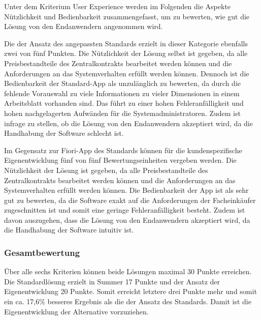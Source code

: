 Unter dem Kriterium User Experience werden im Folgenden die Aspekte Nützlichkeit und Bedienbarkeit zusammengefasst, um zu bewerten, wie gut die Lösung von den Endanwendern angenommen wird. 

Die der Ansatz des angepassten Standards erzielt in dieser Kategorie ebenfalls zwei von fünf Punkten. Die Nützlichkeit der Lösung selbst ist gegeben, da alle Preisbestandteile des Zentralkontrakts bearbeitet werden können und die Anforderungen an das Systemverhalten erfüllt werden können. Dennoch ist die Bedienbarkeit der Standard-App als unzulänglich zu bewerten, da durch die fehlende Vorauswahl zu viele Informationen zu vieler Dimensionen in einem Arbeitsblatt vorhanden sind. Das führt zu einer hohen Fehleranfälligkeit und hohen nachgelagerten Aufwänden für die Systemadministratoren. Zudem ist infrage zu stellen, ob die Lösung von den Endanwendern akzeptiert wird, da die Handhabung der Software schlecht ist.

Im Gegensatz zur Fiori-App des Standards können für die kundenspezifische Eigenentwicklung fünf von fünf Bewertungseinheiten vergeben werden. Die Nützlichkeit der Lösung ist gegeben, da alle Preisbestandteile des Zentralkontrakts bearbeitet werden können und die Anforderungen an das Systemverhalten erfüllt werden können. Die Bedienbarkeit der App ist als sehr gut zu bewerten, da die Software exakt auf die Anforderungen der Facheinkäufer zugeschnitten ist und somit eine geringe Fehleranfälligkeit besteht. Zudem ist davon auszugehen, dass die Lösung von den Endanwendern akzeptiert wird, da die Handhabung der Software intuitiv ist.

\subsubsection{Gesamtbewertung}

Über alle sechs Kriterien können beide Lösungen maximal 30 Punkte erreichen. Die Standardlösung erzielt in Summer 17 Punkte und der Ansatz der Eigenentwicklung 20 Punkte. Somit erreicht letztere drei Punkte mehr und somit ein ca. 17,6\% besseres Ergebnis als die der Ansatz des Standards. Damit ist die Eigenentwicklung der Alternative vorzuziehen.